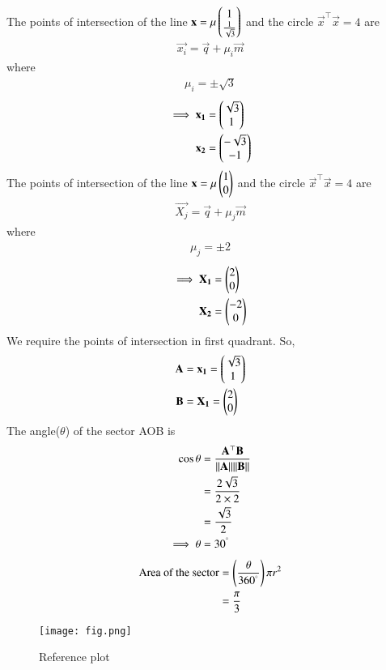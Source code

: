\documentclass[journal,12pt,twocolumn]{IEEEtran}
\begin{document}
The points of intersection of the line $\mathbf{x}=\mu \begin{pmatrix}1 \\ \frac{1}{\sqrt{3}}\end{pmatrix}$ and the circle $\vec{x}^\top\vec{x}=4$ are 
\begin{align}
    \vec{x_i}=\vec{q}+\mu_i\vec{m}
\end{align}
where 
\begin{align}
    \mu_i = \pm\sqrt{3}
\end{align}
\begin{align}
    \implies\mathbf{x_1}&=\begin{pmatrix}\sqrt{3}\\ 1\end{pmatrix}\\ 
    \mathbf{x_2}&=\begin{pmatrix}-\sqrt{3}\\ -1\end{pmatrix}
\end{align}
The points of intersection of the line $\mathbf{x}=\mu\begin{pmatrix}1\\0\end{pmatrix}$ and the circle $\vec{x}^\top\vec{x}=4$ are 
\begin{align}
    \vec{X_j}=\vec{q}+\mu_j\vec{m}
\end{align}
where
\begin{align}
    \mu_j = \pm 2
\end{align}
\begin{align}
    \implies \mathbf{X_1}&=\begin{pmatrix}2\\0\end{pmatrix}\\
    \mathbf{X_2}&=\begin{pmatrix}-2\\0\end{pmatrix}
\end{align}
We require the points of intersection in first quadrant. So, 
\begin{align}
    \mathbf{A}&=\mathbf{x_1}=\begin{pmatrix}\sqrt{3}\\1\end{pmatrix}\\
    \mathbf{B}&=\mathbf{X_1}=\begin{pmatrix}2\\0\end{pmatrix}
\end{align}
The angle($\theta$) of the sector AOB is 
\begin{align}
    \cos{\theta}&=\frac{\mathbf{A}^{\top}\mathbf{B}}{\lVert\mathbf{A}\rVert\lVert\mathbf{B}\rVert}\\
    &=\frac{2\sqrt{3}}{2\times 2}\\
    &=\frac{\sqrt{3}}{2}\\
    \implies \theta &= 30^{\degree}
\end{align}
\begin{align}
    \text{Area of the sector}&=\left(\frac{\theta}{360^{\degree}}\right)\pi r^2\\
    &= \frac{\pi}{3}
\end{align}

\begin{figure}[!h]
 \centering
 \texttt{[image: fig.png]}
 \caption{Reference plot}
 \label{plot}
\end{figure}
\end{document}
